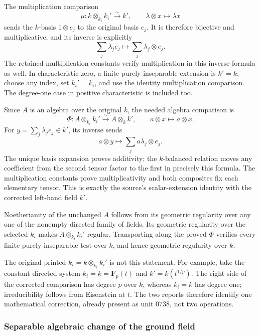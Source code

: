 The multiplication comparison \[
 \mu:k\otimes_{k_i}k_i'\xrightarrow{\sim}k',\qquad
 \lambda\otimes x\longmapsto\lambda x
\] sends the \(k\)-basis \(1\otimes e_j\) to the original basis \(e_j\). It is therefore bijective and multiplicative, and its inverse is explicitly \[
 \sum_j\lambda_je_j\longmapsto\sum_j\lambda_j\otimes e_j.
\] The retained multiplication constants verify multiplication in this inverse formula as well. In characteristic zero, a finite purely inseparable extension is \(k'=k\); choose any index, set \(k_i'=k_i\), and use the identity multiplication comparison. The degree-one case in positive characteristic is included too.

Since \(A\) is an algebra over the original \(k\), the needed algebra comparison is \[
 \Phi:A\otimes_{k_i}k_i'\xrightarrow{\sim}A\otimes_kk',
 \qquad a\otimes x\longmapsto a\otimes x.
\] For \(y=\sum_j\lambda_je_j\in k'\), its inverse sends \[
 a\otimes y\longmapsto\sum_j a\lambda_j\otimes e_j.
\] The unique basis expansion proves additivity; the \(k\)-balanced relation moves any coefficient from the second tensor factor to the first in precisely this formula. The multiplication constants prove multiplicativity and both composites fix each elementary tensor. This is exactly the source's scalar-extension identity with the corrected left-hand field \(k'\).

Noetherianity of the unchanged \(A\) follows from its geometric regularity over any one of the nonempty directed family of fields. Its geometric regularity over the selected \(k_i\) makes \(A\otimes_{k_i}k_i'\) regular. Transporting along the proved \(\Phi\) verifies every finite purely inseparable test over \(k\), and hence geometric regularity over \(k\).

The original printed \(k_i=k\otimes_{k_i}k_i'\) is not this statement. For example, take the constant directed system \(k_i=k=\mathbf F_p(t)\) and \(k'=k(t^{1/p})\). The right side of the corrected comparison has degree \(p\) over \(k\), whereas \(k_i=k\) has degree one; irreducibility follows from Eisenstein at \(t\). The two reports therefore identify one mathematical correction, already present as unit 0738, not two operations.

\subsubsection{Separable algebraic change of the ground field}\label{separable-algebraic-change-of-the-ground-field}

